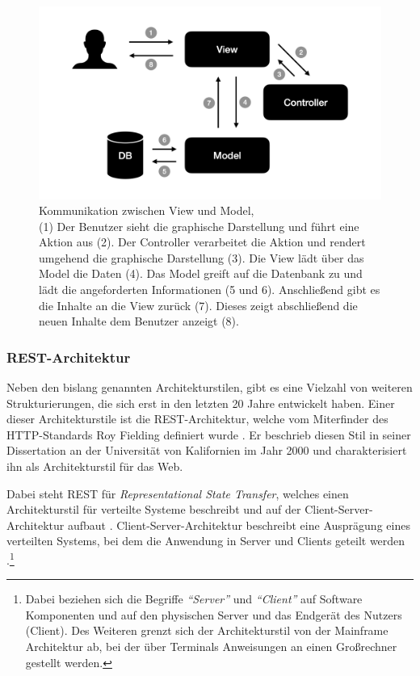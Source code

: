  \begin{figure}
 	\centering
    \includegraphics[width=.6\textwidth]{Assets/Interaktionsorientiert.002}
	\caption[Kommunikation zwischen View und Model]{Kommunikation zwischen View und Model, \\ (1) Der Benutzer sieht die graphische Darstellung und führt eine Aktion aus (2). Der Controller verarbeitet die Aktion und rendert umgehend die graphische Darstellung (3). Die View lädt über das Model die Daten (4). Das Model greift auf die Datenbank zu und lädt die angeforderten Informationen (5 und 6). Anschließend gibt es die Inhalte an die View zurück (7). Dieses zeigt abschließend die neuen Inhalte dem Benutzer anzeigt (8).}
    \label{fig:mvc-vm-kommunikation}
 \end{figure}

\subsubsection{REST-Architektur}
\label{sec:rest}

Neben den bislang genannten Architekturstilen, gibt es eine Vielzahl von weiteren Strukturierungen, die sich erst in den letzten 20 Jahre entwickelt haben. Einer dieser Architekturstile ist die REST-Architektur, welche vom Miterfinder des HTTP-Standards Roy Fielding definiert wurde \parencite[][S. 128]{starke_effektive_2015}. Er beschrieb diesen Stil in seiner Dissertation an der Universität von Kalifornien im Jahr 2000 und charakterisiert ihn als Architekturstil für das Web.

Dabei steht REST für \textit{Representational State Transfer}, welches einen Architekturstil für verteilte Systeme beschreibt und auf der Client-Server-Architektur aufbaut \parencite[][S. 76]{fielding_architectural_2000}. Client-Server-Architektur beschreibt eine Ausprägung eines verteilten Systems, bei dem die Anwendung in Server und Clients geteilt werden \parencite[][S. 117]{starke_effektive_2015}.\footnote{Dabei beziehen sich die Begriffe \textit{\enquote{Server}} und \textit{\enquote{Client}} auf Software Komponenten und auf den physischen Server und das Endgerät des Nutzers (Client). Des Weiteren grenzt sich der Architekturstil von der Mainframe Architektur ab, bei der über Terminals Anweisungen an einen Großrechner gestellt werden.}

